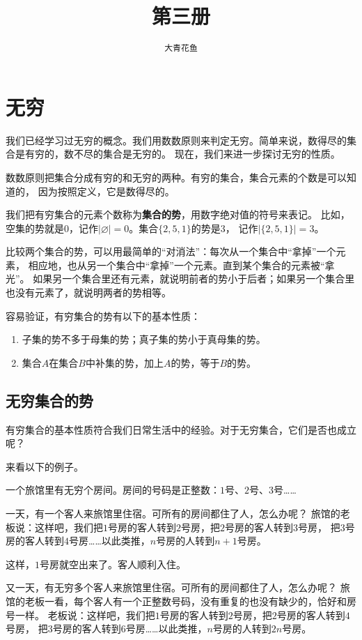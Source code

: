 \documentclass[12pt,UTF8]{ctexbook}
\title{\zihao{0} \bfseries 第三册}
\author{\zihao{2} \texttt{大青花鱼}}
\date{}
\theoremstyle{definition}
\theoremstyle{plain}
\begin{document}
\maketitle
\tableofcontents
\newpage

\chapter{无穷}
我们已经学习过无穷的概念。我们用数数原则来判定无穷。简单来说，数得尽的集合是有穷的，数不尽的集合是无穷的。
现在，我们来进一步探讨无穷的性质。

数数原则把集合分成有穷的和无穷的两种。有穷的集合，集合元素的个数是可以知道的，
因为按照定义，它是数得尽的。

我们把有穷集合的元素个数称为\textbf{集合的势}，用数字绝对值的符号来表记。
比如，空集的势就是$0$，记作$|\varnothing| = 0$。集合$\{2,5,1\}$的势是$3$，
记作$|\{2, 5, 1\}| = 3$。

比较两个集合的势，可以用最简单的“对消法”：每次从一个集合中“拿掉”一个元素，
相应地，也从另一个集合中“拿掉”一个元素。直到某个集合的元素被“拿光”。
如果另一个集合里还有元素，就说明前者的势小于后者；如果另一个集合里也没有元素了，就说明两者的势相等。

容易验证，有穷集合的势有以下的基本性质：
\begin{enumerate}
    \item 子集的势不多于母集的势；真子集的势小于真母集的势。
    \item 集合$A$在集合$B$中补集的势，加上$A$的势，等于$B$的势。
\end{enumerate}

\section{无穷集合的势}

有穷集合的基本性质符合我们日常生活中的经验。对于无穷集合，它们是否也成立呢？

来看以下的例子。

一个旅馆里有无穷个房间。房间的号码是正整数：$1$号、$2$号、$3$号……

一天，有一个客人来旅馆里住宿。可所有的房间都住了人，怎么办呢？
旅馆的老板说：这样吧，我们把$1$号房的客人转到$2$号房，把$2$号房的客人转到$3$号房，
把$3$号房的客人转到$4$号房……以此类推，$n$号房的人转到$n+1$号房。

这样，$1$号房就空出来了。客人顺利入住。

又一天，有无穷多个客人来旅馆里住宿。可所有的房间都住了人，怎么办呢？
旅馆的老板一看，每个客人有一个正整数号码，没有重复的也没有缺少的，恰好和房号一样。
老板说：这样吧，我们把$1$号房的客人转到$2$号房，把$2$号房的客人转到$4$号房，
把$3$号房的客人转到$6$号房……以此类推，$n$号房的人转到$2n$号房。
\end{document}
